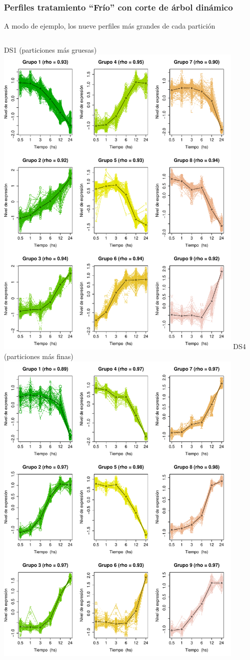\documentclass[serif,9pt, t]{beamer}
\begin{document}
\begin{frame}\frametitle{Perfiles tratamiento ``Frío'' con corte de árbol dinámico} 
\centering
A modo de ejemplo, los nueve perfiles más grandes de cada partición
\begin{columns}[T]
	\centering
	DS1 (particiones más gruesas)
	\includegraphics[width=0.9\textwidth]{perfiles_ds_1.pdf}	
	\centering
	DS4 (particiones más finas)
	\includegraphics[width=0.9\textwidth]{perfiles_ds_4.pdf}	

\end{columns}
\end{frame}
\end{document}
